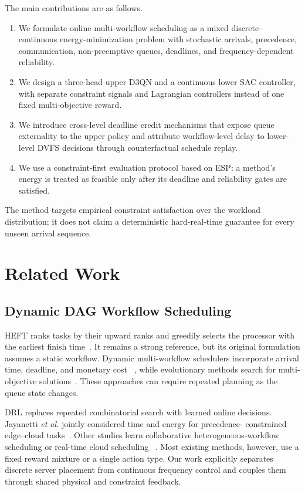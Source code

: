 \documentclass[lettersize,journal]{IEEEtran}
\begin{document}
The main contributions are as follows.
\begin{enumerate}
  \item We formulate online multi-workflow scheduling as a mixed discrete--
  continuous energy-minimization problem with stochastic arrivals, precedence,
  communication, non-preemptive queues, deadlines, and frequency-dependent
  reliability.
  \item We design a three-head upper D3QN and a continuous lower SAC controller,
  with separate constraint signals and Lagrangian controllers instead of one
  fixed multi-objective reward.
  \item We introduce cross-level deadline credit mechanisms that expose queue
  externality to the upper policy and attribute workflow-level delay to lower-
  level DVFS decisions through counterfactual schedule replay.
  \item We use a constraint-first evaluation protocol based on ESP: a method's
  energy is treated as feasible only after its deadline and reliability gates
  are satisfied.
\end{enumerate}
The method targets empirical constraint satisfaction over the workload
distribution; it does not claim a deterministic hard-real-time guarantee for
every unseen arrival sequence.

\section{Related Work}
\label{sec:related_work}

\subsection{Dynamic DAG Workflow Scheduling}
HEFT ranks tasks by their upward ranks and greedily selects the processor with
the earliest finish time~\cite{topcuoglu2002}. It remains a strong reference,
but its original formulation assumes a static workflow. Dynamic multi-workflow
schedulers incorporate arrival time, deadline, and monetary cost
~\cite{arabnejad2019}, while evolutionary methods search for multi-objective
solutions~\cite{ismayilov2020}. These approaches can require repeated planning
as the queue state changes.

DRL replaces repeated combinatorial search with learned online decisions.
Jayanetti \emph{et al.} jointly considered time and energy for precedence-
constrained edge--cloud tasks~\cite{jayanetti2022}. Other studies learn
collaborative heterogeneous-workflow scheduling or real-time cloud scheduling
~\cite{chen2023,pan2024}. Most existing methods, however, use a fixed reward
mixture or a single action type. Our work explicitly separates discrete server
placement from continuous frequency control and couples them through shared
physical and constraint feedback.
\end{document}
